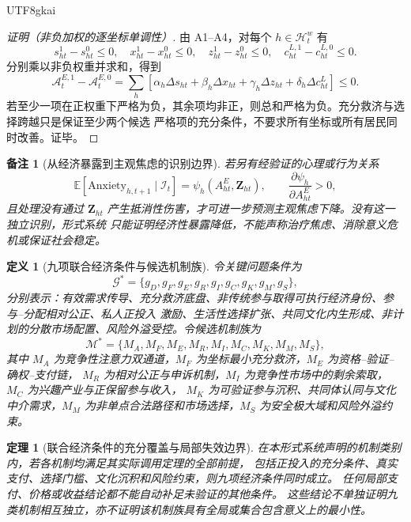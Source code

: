 \documentclass[12pt,a4paper,openany]{report}
\newtheorem{definition}{定义}[chapter]
\newtheorem{theorem}{定理}[chapter]
\newtheorem{remark}{备注}[chapter]
\newcommand{\EE}{\mathbb E}
\begin{document}
\begin{CJK*}{UTF8}{gkai}
\begin{proof}[证明（非负加权的逐坐标单调性）]
由 A1--A4，对每个 \(h\in\mathcal H_t^w\) 有
\[
  s_{ht}^{1}-s_{ht}^{0}\le0,\quad
  x_{ht}^{1}-x_{ht}^{0}\le0,\quad
  z_{ht}^{1}-z_{ht}^{0}\le0,\quad
  c_{ht}^{L,1}-c_{ht}^{L,0}\le0.
\]
分别乘以非负权重并求和，得到
\[
  \mathcal A_t^{E,1}-\mathcal A_t^{E,0}
  =
  \sum_h
  \left[
  \alpha_h\Delta s_{ht}
  +\beta_h\Delta x_{ht}
  +\gamma_h\Delta z_{ht}
  +\delta_h\Delta c_{ht}^{L}
  \right]
  \le0.
\]
若至少一项在正权重下严格为负，其余项均非正，则总和严格为负。充分救济与选择跨越只是保证至少两个候选
严格项的充分条件，不要求所有坐标或所有居民同时改善。证毕。
\end{proof}

\begin{remark}[从经济暴露到主观焦虑的识别边界]
若另有经验证的心理或行为关系
\[
  \EE[\mathrm{Anxiety}_{h,t+1}\mid\mathcal I_t]
  =\psi_h(A_{ht}^{E},\mathbf Z_{ht}),
  \qquad
  \frac{\partial\psi_h}{\partial A_{ht}^{E}}>0,
\]
且处理没有通过 \(\mathbf Z_{ht}\) 产生抵消性伤害，才可进一步预测主观焦虑下降。没有这一独立识别，形式系统
只能证明经济性暴露降低，不能声称治疗焦虑、消除意义危机或保证社会稳定。
\end{remark}

\begin{definition}[九项联合经济条件与候选机制族]
令关键问题条件为
\[
  \mathcal G^{*}
  =
  \{
  g_D,g_F,g_E,g_R,g_I,g_C,g_K,g_M,g_S
  \},
\]
分别表示：有效需求传导、充分救济底盘、非传统参与取得可执行经济身份、参与--分配相对公正、私人正投入
激励、生活性选择扩张、共同文化内生形成、非计划的分散市场配置、风险外溢受控。令候选机制族为
\[
  \mathcal M^{*}
  =
  \{
  M_A,M_F,M_E,M_R,M_I,M_C,M_K,M_M,M_S
  \},
\]
其中 \(M_A\) 为竞争性注意力双通道，\(M_F\) 为坐标最小充分救济，\(M_E\) 为资格--验证--确权--支付链，
\(M_R\) 为相对公正与申诉机制，\(M_I\) 为竞争性市场中的剩余索取，\(M_C\) 为兴趣产业与正保留参与收入，
\(M_K\) 为可验证参与沉积、共同体认同与文化中介需求，\(M_M\) 为非单点合法路径和市场选择，\(M_S\) 为安全极大域和风险外溢约束。
\end{definition}

\begin{theorem}[联合经济条件的充分覆盖与局部失效边界]
\label{thm:joint-economic-conditions}
在本形式系统声明的机制类别内，若各机制均满足其实际调用定理的全部前提，
包括正投入的充分条件、真实支付、选择门槛、文化沉积和风险约束，则九项经济条件同时成立。
任何局部支付、价格或收益结论都不能自动补足未验证的其他条件。
这些结论不单独证明九类机制相互独立，亦不证明该机制族具有全局或集合包含意义上的最小性。
\end{theorem}


\end{CJK*}
\end{document}
